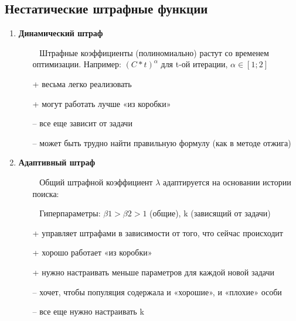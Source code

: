 \subsection{Нестатические штрафные функции}
\begin{enumerate}
    \item \textbf{Динамический штраф}
    \begin{itemize}
        \item [~] Штрафные коэффициенты (полиномиально) растут со временем оптимизации. Например: $(C * t)^\alpha$ для t-ой
        итерации, $\alpha \in [1; 2]$
        \item [+] весьма легко реализовать
        \item [+] могут работать лучше «из коробки»
        \item [--] все еще зависит от задачи
        \item [--] может быть трудно найти правильную формулу (как в методе отжига)
    \end{itemize}

    \item \textbf{Адаптивный штраф}
    \begin{itemize}
        \item [~] Общий штрафной коэффициент $\lambda$ адаптируется на основании истории поиска:
        \item [~] Гиперпараметры: $\beta1 > \beta2 > 1$ (общие), k (зависящий от задачи)
        \item [+] управляет штрафами в зависимости от того, что сейчас происходит
        \item [+] хорошо работает «из коробки»
        \item [+] нужно настраивать меньше параметров для каждой новой задачи
        \item [--] хочет, чтобы популяция содержала и «хорошие», и «плохие» особи
        \item [--] все еще нужно настраивать k
    \end{itemize}
\end{enumerate}
